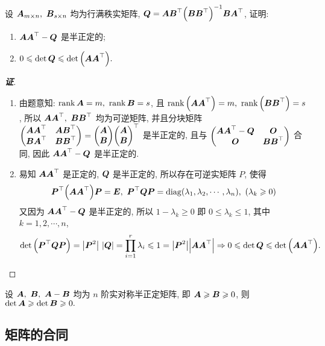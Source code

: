 \begin{example}[1994 华中师范大学]
    设 $\vb*{A}_{m\times n},~\vb*{B}_{s\times n}$ 均为行满秩实矩阵, $\vb*{Q}=\vb*{AB}^\top\qty(\vb*{BB}^\top)^{-1}\vb*{BA}^\top$, 证明:
    \begin{enumerate}[label=(\arabic{*})]
        \item $\vb*{AA}^\top-\vb*{Q}$ 是半正定的;
        \item $0\leqslant \det\vb*{Q}\leqslant \det\qty(\vb*{AA}^\top).$
    \end{enumerate}
\end{example}
\begin{proof}[{\songti \textbf{证}}]
    \begin{enumerate}[label=(\arabic{*})]
        \item 由题意知: $\rank\vb*{A}=m,~\rank\vb*{B}=s$, 且 $\rank\qty(\vb*{AA}^\top)=m,~\rank\qty(\vb*{BB}^\top)=s$,
              所以 $\vb*{AA}^\top,~\vb*{BB}^\top$ 均为可逆矩阵, 并且分块矩阵 $\mqty(\vb*{AA}^\top&\vb*{AB}^\top\\\vb*{BA}^\top&\vb*{BB}^\top)=\mqty(\vb*{A}\\\vb*{B})\mqty(\vb*{A}\\\vb*{B})^\top$ 是半正定的, 且与 $\mqty(\vb*{AA}^\top-\vb*{Q}&\vb*{O}\\\vb*{O}&\vb*{BB}^\top)$ 合同,
              因此 $\vb*{AA}^\top-\vb*{Q}$ 是半正定的.
        \item 易知 $\vb*{AA}^\top$ 是正定的, $\vb*{Q}$ 是半正定的, 所以存在可逆实矩阵 $P$, 使得 $$\vb*{P}^\top\qty(\vb*{AA}^\top)\vb*{P}=\vb*{E},~\vb*{P}^\top\vb*{QP}=\mathrm{diag}(\lambda_1,\lambda_2,\cdots,\lambda_n),~(\lambda_k\geqslant 0)$$
              又因为 $\vb*{AA}^\top-\vb*{Q}$ 是半正定的, 所以 $1-\lambda_k\geqslant 0$ 即 $0\leqslant \lambda_k\leqslant 1$, 其中 $k=1,2,\cdots,n$,
              $$\det\qty(\vb*{P}^\top\vb*{QP})=\qty|\vb*{P}^2|~\qty|\vb*{Q}|=\prod_{i=1}^{r}\lambda_i\leqslant 1=\qty|\vb*{P}^2|\qty|\vb*{AA}^\top|\Rightarrow 0\leqslant \det\vb*{Q}\leqslant \det\qty(\vb*{AA}^\top).$$
    \end{enumerate}
\end{proof}

\begin{inference}[实对称半正定矩阵的单调性]
    设 $\vb*{A},~\vb*{B},~\vb*{A}-\vb*{B}$ 均为 $n$ 阶实对称半正定矩阵, 即 $\vb*{A}\geqslant \vb*{B}\geqslant 0$, 则 $\det\vb*{A}\geqslant \det\vb*{B}\geqslant 0.$
\end{inference}

\subsection{矩阵的合同}

